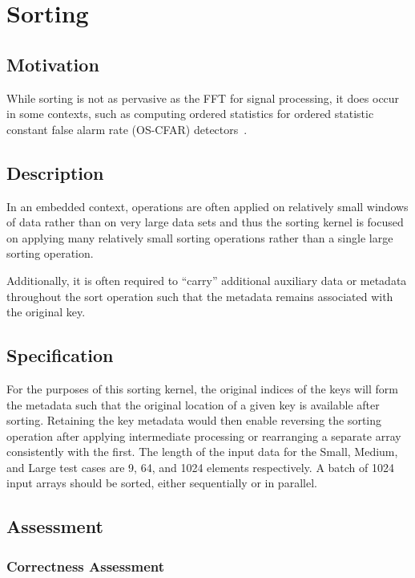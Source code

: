 \documentclass{report}
\begin{document}
\section{Sorting}

\subsection{Motivation}

While sorting is not as pervasive as the FFT for signal processing, it does occur
in some contexts, such as computing ordered statistics for ordered statistic
constant false alarm rate (OS-CFAR) detectors~\cite{Rohling1983}.

\subsection{Description}

In an embedded context, operations are often applied on relatively
small windows of data rather than on very large data sets and thus the sorting
kernel is focused on applying many relatively small sorting operations
rather than a single large sorting operation.

Additionally, it is often required to ``carry'' additional auxiliary data
or metadata throughout the sort operation such that the metadata remains
associated with the original key.


\subsection{Specification}

For the purposes of this sorting kernel, the original indices
of the keys will form the metadata such that the original location
of a given key is available after sorting.
Retaining the key metadata would then enable reversing the sorting
operation after applying intermediate processing or rearranging a
separate array consistently with the first.
The length of the input data for the Small, Medium, and Large 
test cases are 9, 64, and 1024 elements respectively.
A batch of 1024 input arrays should be sorted, either sequentially
or in parallel.

\subsection{Assessment}

\subsubsection{Correctness Assessment}
\end{document}
